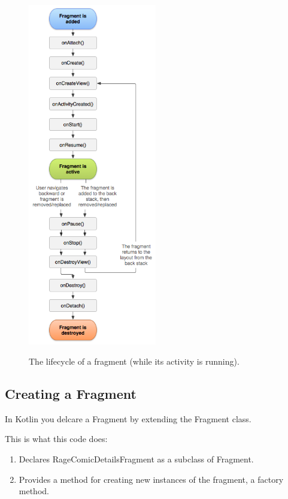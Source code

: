 \begin{figure}
	\centering
	\includegraphics[width=0.5\textwidth]{images/fragments/lifecycle.png}
	\label{fig:fragcycle}
	\caption{The lifecycle of a fragment (while its activity is running).}
\end{figure}

\subsection{Creating a Fragment}
In Kotlin you delcare a Fragment by extending the Fragment class. 


This is what this code does:
\begin{enumerate}
	\item Declares RageComicDetailsFragment as a subclass of Fragment.
	\item Provides a method for creating new instances of the fragment, a factory method.
\end{enumerate}

